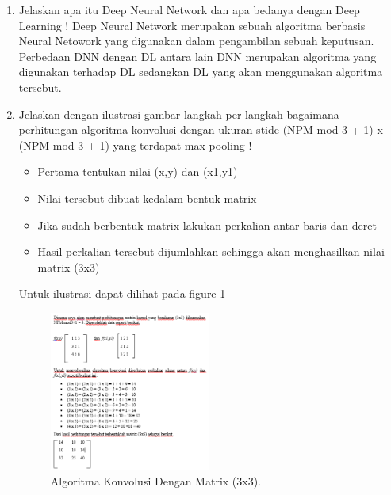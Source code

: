 \begin{enumerate}
\item Jelaskan apa itu Deep Neural Network dan apa bedanya dengan Deep Learning !
	\subitem Deep Neural Network merupakan sebuah algoritma berbasis Neural Netowork yang digunakan dalam pengambilan sebuah keputusan. Perbedaan DNN dengan DL antara lain DNN merupakan algoritma yang digunakan terhadap DL sedangkan DL yang akan menggunakan algoritma tersebut.

\item Jelaskan dengan ilustrasi gambar langkah per langkah bagaimana perhitungan algoritma konvolusi dengan ukuran stide (NPM mod 3 + 1) x (NPM mod 3 + 1) yang terdapat max pooling !

	\begin{itemize}
		\item Pertama tentukan nilai (x,y) dan (x1,y1)
		\item Nilai tersebut dibuat kedalam bentuk matrix
		\item Jika sudah berbentuk matrix lakukan perkalian antar baris dan deret
		\item Hasil perkalian tersebut dijumlahkan sehingga akan menghasilkan nilai matrix (3x3)
	\end{itemize}

	\subitem Untuk ilustrasi dapat dilihat pada figure \ref{YNC7-8}

	\begin{figure}[!htbp!]
		\centerline{\includegraphics[width=0.5\textwidth]{figures/YN/Chapter7/YNC7-8.png}}
		\caption{Algoritma Konvolusi Dengan Matrix (3x3).}
		\label{YNC7-8}
	\end{figure}	


\end{enumerate}
